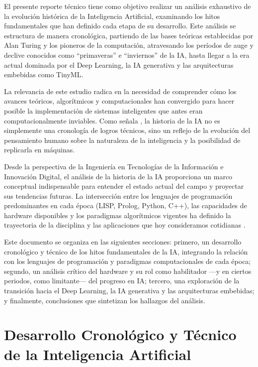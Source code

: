 \documentclass[12pt,a4paper]{article}
\begin{document}
El presente reporte técnico tiene como objetivo realizar un análisis exhaustivo de la evolución histórica de la Inteligencia Artificial, examinando los hitos fundamentales que han definido cada etapa de su desarrollo. Este análisis se estructura de manera cronológica, partiendo de las bases teóricas establecidas por Alan Turing y los pioneros de la computación, atravesando los períodos de auge y declive conocidos como ``primaveras'' e ``inviernos'' de la IA, hasta llegar a la era actual dominada por el Deep Learning, la IA generativa y las arquitecturas embebidas como TinyML.

La relevancia de este estudio radica en la necesidad de comprender cómo los avances teóricos, algorítmicos y computacionales han convergido para hacer posible la implementación de sistemas inteligentes que antes eran computacionalmente inviables. Como señala \citet{buchanan2005}, la historia de la IA no es simplemente una cronología de logros técnicos, sino un reflejo de la evolución del pensamiento humano sobre la naturaleza de la inteligencia y la posibilidad de replicarla en máquinas.

Desde la perspectiva de la Ingeniería en Tecnologías de la Información e Innovación Digital, el análisis de la historia de la IA proporciona un marco conceptual indispensable para entender el estado actual del campo y proyectar sus tendencias futuras. La intersección entre los lenguajes de programación predominantes en cada época (LISP, Prolog, Python, C++), las capacidades de hardware disponibles y los paradigmas algorítmicos vigentes ha definido la trayectoria de la disciplina y las aplicaciones que hoy consideramos cotidianas \citep{gill2022}.

Este documento se organiza en las siguientes secciones: primero, un desarrollo cronológico y técnico de los hitos fundamentales de la IA, integrando la relación con los lenguajes de programación y paradigmas computacionales de cada época; segundo, un análisis crítico del hardware y su rol como habilitador ---y en ciertos periodos, como limitante--- del progreso en IA; tercero, una exploración de la transición hacia el Deep Learning, la IA generativa y las arquitecturas embebidas; y finalmente, conclusiones que sintetizan los hallazgos del análisis.

\section{Desarrollo Cronológico y Técnico de la Inteligencia Artificial}
\end{document}
